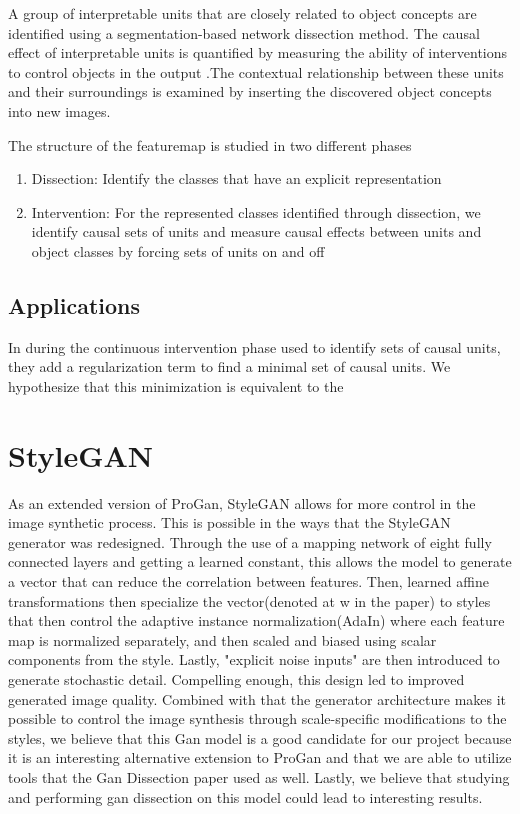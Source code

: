 \documentclass{article}
\begin{document}
 A group of interpretable units that are closely related to object concepts are identified using a segmentation-based network dissection method. The causal effect of interpretable units is quantified by measuring the ability of interventions to control objects in the output .The contextual relationship between these units and their surroundings is examined by inserting the discovered object concepts into new images.

The structure of the featuremap is studied in two different phases
\begin{enumerate} 
\item Dissection: Identify the classes that have an explicit representation
\item Intervention: For the represented classes identified through dissection, we identify causal sets of units and measure causal effects between units and object classes by forcing sets of units on and off 
\end{enumerate}

\subsection{Applications}

In \citet{gandissect2019} during the continuous intervention phase used to identify sets of causal units, they add a regularization term to find a minimal set of causal units. We hypothesize that this minimization is equivalent to the 

\section{StyleGAN}

As an extended version of ProGan, StyleGAN allows for more control in the image synthetic process. This is possible in the ways that the StyleGAN generator was redesigned. Through the use of a mapping network of eight fully connected layers and getting a learned constant, this allows the model to generate a vector that can reduce the correlation between features. Then, learned affine transformations then specialize the vector(denoted at w in the paper) to styles that then control the adaptive instance normalization(AdaIn) where each feature map is normalized separately, and then scaled and biased using scalar components from the style. Lastly, "explicit noise inputs" are then introduced to generate stochastic detail. Compelling enough, this design led to improved generated image quality. Combined with that the generator architecture makes it possible to control the image synthesis through scale-specific modifications to the styles, we believe that this Gan model is a good candidate for our project because it is an interesting alternative extension to ProGan and that we are able to utilize tools that the Gan Dissection paper used as well. Lastly, we believe that studying and performing gan dissection on this model could lead to interesting results.
\end{document}
